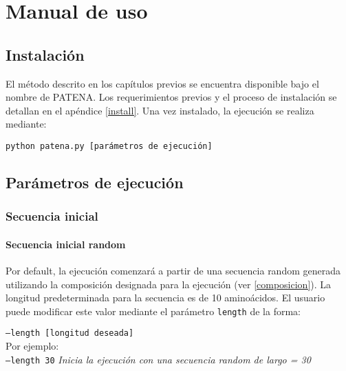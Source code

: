 \chapter{Manual de uso}\label{manual}

% 


\section{Instalación}

El método descrito en los capítulos previos se encuentra disponible bajo el nombre de PATENA. 
Los requerimientos previos y el proceso de instalación se detallan en el apéndice \ref{install}.
Una vez instalado, la ejecución se realiza mediante: 

\texttt{python patena.py [parámetros de ejecución]}

\section{Parámetros de ejecución}\label{parametros}


\subsection{Secuencia inicial} \label{secuenciaInicial}
\subsubsection{Secuencia inicial random}\label{secuenciaInicialRandom}
Por default, la ejecución comenzará a partir de una secuencia random generada utilizando la composición designada para la ejecución (ver \ref{composicion}).
La longitud predeterminada para la secuencia es de 10 aminoácidos. 
El usuario puede modificar este valor mediante el parámetro \texttt{length} de la forma: 

\indent \texttt{--length [longitud deseada]}
\\Por ejemplo: \\
\indent \texttt{--length 30} \hspace{0.5cm} \textit{Inicia la ejecución con una secuencia random de largo = 30}



